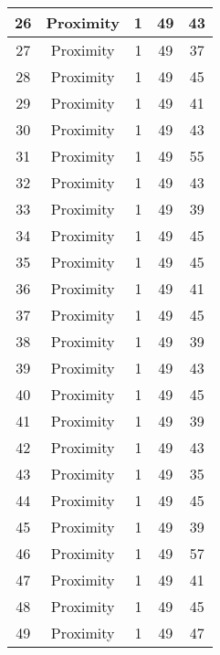 \documentclass[results.tex]{subfiles}
\begin{document}
\begin{center}
\begin{tabular}{| c || c | c | c | c |}
    \hline
    26 & Proximity & 1 & 49 & 43 \\ 
    \hline
    27 & Proximity & 1 & 49 & 37 \\ 
    \hline
    28 & Proximity & 1 & 49 & 45 \\ 
    \hline
    29 & Proximity & 1 & 49 & 41 \\ 
    \hline
    30 & Proximity & 1 & 49 & 43 \\ 
    \hline
    31 & Proximity & 1 & 49 & 55 \\ 
    \hline
    32 & Proximity & 1 & 49 & 43 \\ 
    \hline
    33 & Proximity & 1 & 49 & 39 \\ 
    \hline
    34 & Proximity & 1 & 49 & 45 \\ 
    \hline
    35 & Proximity & 1 & 49 & 45 \\ 
    \hline
    36 & Proximity & 1 & 49 & 41 \\ 
    \hline
    37 & Proximity & 1 & 49 & 45 \\ 
    \hline
    38 & Proximity & 1 & 49 & 39 \\ 
    \hline
    39 & Proximity & 1 & 49 & 43 \\ 
    \hline
    40 & Proximity & 1 & 49 & 45 \\ 
    \hline
    41 & Proximity & 1 & 49 & 39 \\ 
    \hline
    42 & Proximity & 1 & 49 & 43 \\ 
    \hline
    43 & Proximity & 1 & 49 & 35 \\ 
    \hline
    44 & Proximity & 1 & 49 & 45 \\ 
    \hline
    45 & Proximity & 1 & 49 & 39 \\ 
    \hline
    46 & Proximity & 1 & 49 & 57 \\ 
    \hline
    47 & Proximity & 1 & 49 & 41 \\ 
    \hline
    48 & Proximity & 1 & 49 & 45 \\ 
    \hline
    49 & Proximity & 1 & 49 & 47 \\ 
    \hline   \end{tabular}
\end{center}
\end{document}
